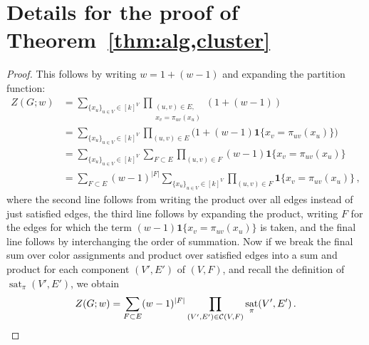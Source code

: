 \documentclass[10pt,a4paper]{article}
\theoremstyle{definition}
\newcommand*{\comp}{\mathcal{C}}
\DeclareMathOperator{\sat}{sat}
\newcommand*{\indicator}[1]{\mathbf{1}\bm{\{}#1\bm{\}}}
\begin{document}
\section{Details for the proof of Theorem~\ref{thm:alg,cluster}}
\begin{proof}
This follows by writing $w=1+(w-1)$ and expanding the partition function:
\begin{align*}
Z(G; w) 
  &= \sum_{\{x_u\}_{u\in V}\in[k]^V} \prod_{\substack{(u,v)\in E,\\ x_v=\pi_{uv}(x_u)}}(1 + (w-1))
\\&= \sum_{\{x_u\}_{u\in V}\in[k]^V} \prod_{(u,v)\in E}\Big(1 + (w-1)\indicator{x_v=\pi_{uv}(x_u)}\Big)
\\&= \sum_{\{x_u\}_{u\in V}\in[k]^V} \sum_{F\subset E}\prod_{(u,v)\in F}(w-1)\indicator{x_v=\pi_{uv}(x_u)}
\\&= \sum_{F\subset E}(w-1)^{|F|}\sum_{\{x_u\}_{u\in V}\in[k]^V} \prod_{(u,v)\in F}\indicator{x_v=\pi_{uv}(x_u)}\,,
\end{align*}
where the second line follows from writing the product over all edges instead of just satisfied edges, the third line follows by expanding the product, writing $F$ for the edges for which the term $(w-1)\indicator{x_v=\pi_{uv}(x_u)}$ is taken, and the final line follows by interchanging the order of summation.
Now if we break the final sum over color assignments and product over satisfied edges into a sum and product for each component $(V',E')$ of $(V,F)$, and recall the definition of $\sat_\pi(V',E')$, we obtain
\[
Z(G;w) = \sum_{F\subset E}(w-1)^{|F|}\prod_{(V',E')\in\comp(V,F)}\sat_\pi(V',E')\,.\qedhere
\]
\end{proof}
\end{document}
